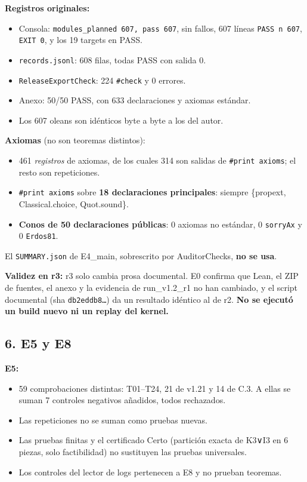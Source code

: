 \documentclass[
]{article}
\providecommand{\tightlist}{%
  \setlength{\itemsep}{0pt}\setlength{\parskip}{0pt}}
\begin{document}
\textbf{Registros originales:}

\begin{itemize}
\tightlist
\item
  Consola: \texttt{modules\_planned\ 607,\ pass\ 607}, sin fallos, 607
  líneas \texttt{PASS\ n\ 607}, \texttt{EXIT\ 0}, y los 19 targets en
  PASS.
\item
  \texttt{records.jsonl}: 608 filas, todas PASS con salida 0.
\item
  \texttt{ReleaseExportCheck}: 224 \texttt{\#check} y 0 errores.
\item
  Anexo: 50/50 PASS, con 633 declaraciones y axiomas estándar.
\item
  Los 607 oleans son idénticos byte a byte a los del autor.
\end{itemize}

\textbf{Axiomas} (no son teoremas distintos):

\begin{itemize}
\tightlist
\item
  461 \emph{registros} de axiomas, de los cuales 314 son salidas de
  \texttt{\#print\ axioms}; el resto son repeticiones.
\item
  \texttt{\#print\ axioms} sobre \textbf{18 declaraciones principales}:
  siempre \{propext, Classical.choice, Quot.sound\}.
\item
  \textbf{Conos de 50 declaraciones públicas}: 0 axiomas no estándar, 0
  \texttt{sorryAx} y 0 \texttt{Erdos81}.
\end{itemize}

El \texttt{SUMMARY.json} de E4\_main, sobrescrito por AuditorChecks,
\textbf{no se usa}.

\textbf{Validez en r3:} r3 solo cambia prosa documental. E0 confirma que
Lean, el ZIP de fuentes, el anexo y la evidencia de run\_v1.2\_r1 no han
cambiado, y el script documental (sha \texttt{db2eddb8…}) da un
resultado idéntico al de r2. \textbf{No se ejecutó un build nuevo ni un
replay del kernel.}

\subsection{6. E5 y E8}\label{6-e5-y-e8}

\textbf{E5:}

\begin{itemize}
\tightlist
\item
  59 comprobaciones distintas: T01--T24, 21 de v1.21 y 14 de C.3. A
  ellas se suman 7 controles negativos añadidos, todos rechazados.
\item
  Las repeticiones no se suman como pruebas nuevas.
\item
  Las pruebas finitas y el certificado Certo (partición exacta de K3∨I3
  en 6 piezas, solo factibilidad) no sustituyen las pruebas universales.
\item
  Los controles del lector de logs pertenecen a E8 y no prueban
  teoremas.
\end{itemize}
\end{document}
